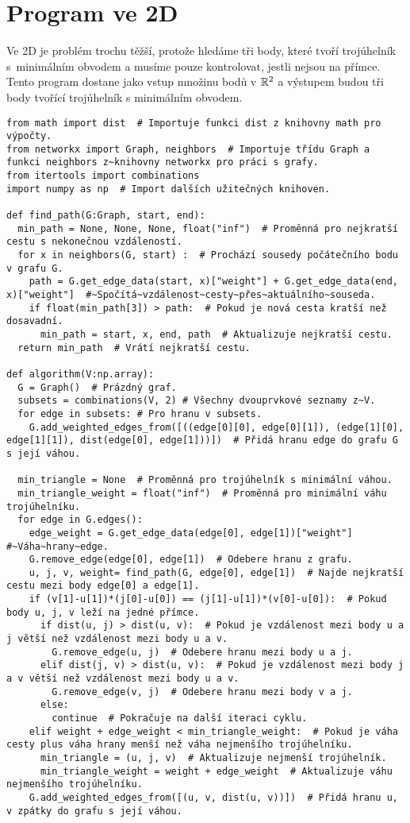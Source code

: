 \section{Program ve 2D}
\label{sec:program_2D}

Ve 2D je problém trochu těžší, protože hledáme tři body, které tvoří trojúhelník s~minimálním obvodem a musíme pouze kontrolovat, jestli nejsou na přímce. Tento program dostane jako vstup množinu bodů v $\mathbb{R}^2$ a výstupem budou tři body tvořící trojúhelník s minimálním obvodem. 
\begin{mdframed}[style=MyFrame]
\begin{lstlisting}[style=metoo]
from math import dist  # Importuje funkci dist z knihovny math pro výpočty.
from networkx import Graph, neighbors  # Importuje třídu Graph a funkci neighbors z~knihovny networkx pro práci s grafy.
from itertools import combinations
import numpy as np  # Import dalších užitečných knihoven.

def find_path(G:Graph, start, end):
  min_path = None, None, None, float("inf")  # Proměnná pro nejkratší cestu s nekonečnou vzdáleností.
  for x in neighbors(G, start) :  # Prochází sousedy počátečního bodu v grafu G.
    path = G.get_edge_data(start, x)["weight"] + G.get_edge_data(end, x)["weight"]  #~Spočítá~vzdálenost~cesty~přes~aktuálního~souseda.
    if float(min_path[3]) > path:  # Pokud je nová cesta kratší než dosavadní.
      min_path = start, x, end, path  # Aktualizuje nejkratší cestu.
  return min_path  # Vrátí nejkratší cestu.

def algorithm(V:np.array):
  G = Graph()  # Prázdný graf.
  subsets = combinations(V, 2) # Všechny dvouprvkové seznamy z~V.
  for edge in subsets: # Pro hranu v subsets.
    G.add_weighted_edges_from([((edge[0][0], edge[0][1]), (edge[1][0], edge[1][1]), dist(edge[0], edge[1]))])  # Přidá hranu edge do grafu G s její váhou.

  min_triangle = None  # Proměnná pro trojúhelník s minimální váhou.
  min_triangle_weight = float("inf")  # Proměnná pro minimální váhu trojúhelníku.
  for edge in G.edges():  
    edge_weight = G.get_edge_data(edge[0], edge[1])["weight"]        #~Váha~hrany~edge.
    G.remove_edge(edge[0], edge[1])  # Odebere hranu z grafu.
    u, j, v, weight= find_path(G, edge[0], edge[1])  # Najde nejkratší cestu mezi body edge[0] a edge[1].
    if (v[1]-u[1])*(j[0]-u[0]) == (j[1]-u[1])*(v[0]-u[0]):  # Pokud body u, j, v leží na jedné přímce.
      if dist(u, j) > dist(u, v):  # Pokud je vzdálenost mezi body u a j větší než vzdálenost mezi body u a v.
        G.remove_edge(u, j)  # Odebere hranu mezi body u a j.
      elif dist(j, v) > dist(u, v):  # Pokud je vzdálenost mezi body j a v větší než vzdálenost mezi body u a v.
        G.remove_edge(v, j)  # Odebere hranu mezi body v a j.
      else:
        continue  # Pokračuje na další iteraci cyklu.
    elif weight + edge_weight < min_triangle_weight:  # Pokud je váha cesty plus váha hrany menší než váha nejmenšího trojúhelníku.
      min_triangle = (u, j, v)  # Aktualizuje nejmenší trojúhelník.
      min_triangle_weight = weight + edge_weight  # Aktualizuje váhu nejmenšího trojúhelníku.
    G.add_weighted_edges_from([(u, v, dist(u, v))])  # Přidá hranu u, v zpátky do grafu s její váhou.


\end{lstlisting}
\end{mdframed}
